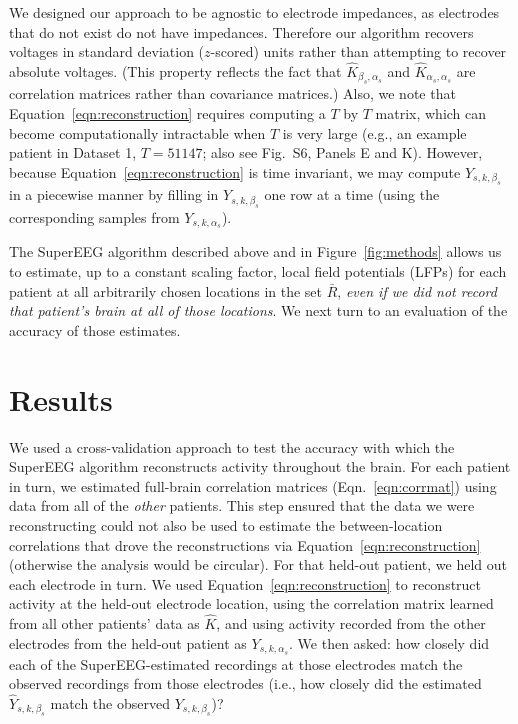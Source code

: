 \documentclass[11pt]{article}
\newcommand{\suppstats}{S6}
\begin{document}
We designed our approach to be agnostic to electrode impedances, as electrodes
that do not exist do not have impedances.  Therefore our algorithm recovers
voltages in standard deviation ($z$-scored) units rather than attempting to
recover absolute voltages. (This property reflects the fact that
$\hat{K}_{\beta_s, \alpha_s}$ and $\hat{K}_{\alpha_s, \alpha_s}$ are correlation
matrices rather than covariance matrices.)  Also, we note that
Equation~\ref{eqn:reconstruction} requires computing a $T$ by $T$ matrix, which
can become computationally intractable when $T$ is very large (e.g., an example
patient in Dataset 1, $T = 51147$; also see Fig.~\suppstats, Panels E and
K). However, because Equation~\ref{eqn:reconstruction} is time invariant, we may
compute $Y_{s,k,\beta_s}$ in a piecewise manner by filling in $Y_{s,k,\beta_s}$
one row at a time (using the corresponding samples from $Y_{s, k, \alpha_s}$).

The SuperEEG algorithm described above and in Figure~\ref{fig:methods} allows us
to estimate, up to a constant scaling factor, local field potentials (LFPs) for
each patient at all arbitrarily chosen locations in the set $\bar{R}$,
\textit{even if we did not record that patient's brain at all of those
locations}.  We next turn to an evaluation of the accuracy of those estimates.

\section*{Results}
We used a cross-validation approach to test the accuracy with
which the SuperEEG algorithm reconstructs activity throughout the brain. For
each patient in turn, we estimated full-brain correlation matrices
(Eqn.~\ref{eqn:corrmat}) using data from all of the \textit{other} patients.
This step ensured that the data we were reconstructing could not also be used to
estimate the between-location correlations that drove the reconstructions via
Equation~\ref{eqn:reconstruction} (otherwise the analysis would be circular).
For that held-out patient, we held out each electrode in turn.  We used
Equation~\ref{eqn:reconstruction} to reconstruct activity at the held-out
electrode location, using the correlation matrix learned from all other
patients' data as $\hat{K}$, and using activity recorded from the other
electrodes from the held-out patient as $Y_{s, k, \alpha_s}$.  We then asked:
how closely did each of the SuperEEG-estimated recordings at those electrodes
match the observed recordings from those electrodes (i.e., how closely did the
estimated $\hat{Y}_{s, k, \beta_s}$ match the observed $Y_{s, k, \beta_s}$)?
\end{document}
